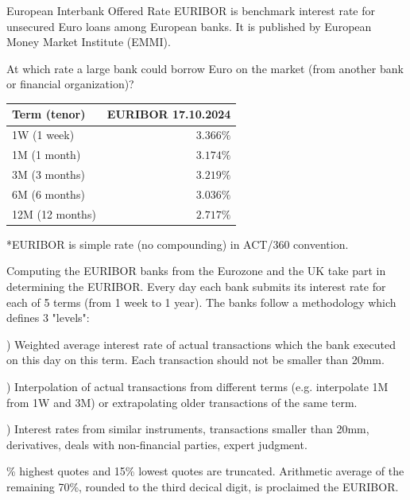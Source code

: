 \documentclass{beamer}
\begin{document}
\begin{frame}{European Interbank Offered Rate}
\justify
\alert{EURIBOR} is benchmark interest rate for unsecured Euro loans among European banks. It is published by European Money Market Institute (EMMI).

\justify
At which rate a large bank could borrow Euro on the market (from another bank or financial organization)?

\justify
\centering
\begin{tabular}{l|r}
Term (tenor)     & EURIBOR 17.10.2024 \\ \hline
1W (1 week)    & $3.366\%$ \\
1M (1 month)     & $3.174\%$ \\
3M (3 months)    & $3.219\%$ \\
6M (6 months)   & $3.036\%$ \\
12M (12 months) & $2.717\%$ 
\end{tabular}

\justify
*EURIBOR is simple rate (no compounding) in ACT/360 convention.
\end{frame}



\begin{frame}{Computing the EURIBOR}
 banks from the Eurozone and the UK take part in determining the EURIBOR. Every day each bank submits its interest rate for each of 5 terms (from 1 week to 1 year). The banks follow a methodology which defines 3 "levels":

) Weighted average interest rate of actual transactions which the bank executed on this day on this term. Each transaction should not be smaller than 20mm.

) Interpolation of actual transactions from different terms (e.g. interpolate 1M from 1W and 3M) or extrapolating older transactions of the same term.

) Interest rates from similar instruments, transactions smaller than 20mm, derivatives, deals with non-financial parties, expert judgment. 

\% highest quotes and 15\% lowest quotes are truncated. Arithmetic average of the remaining 70\%, rounded to the third decical digit, is proclaimed the EURIBOR.
\end{frame}
\end{document}
